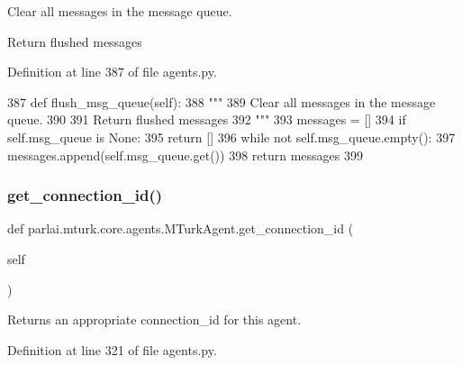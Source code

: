 \begin{DoxyVerb}Clear all messages in the message queue.

Return flushed messages
\end{DoxyVerb}
 

Definition at line 387 of file agents.\+py.


\begin{DoxyCode}
387     \textcolor{keyword}{def }flush\_msg\_queue(self):
388         \textcolor{stringliteral}{"""}
389 \textcolor{stringliteral}{        Clear all messages in the message queue.}
390 \textcolor{stringliteral}{}
391 \textcolor{stringliteral}{        Return flushed messages}
392 \textcolor{stringliteral}{        """}
393         messages = []
394         \textcolor{keywordflow}{if} self.msg\_queue \textcolor{keywordflow}{is} \textcolor{keywordtype}{None}:
395             \textcolor{keywordflow}{return} []
396         \textcolor{keywordflow}{while} \textcolor{keywordflow}{not} self.msg\_queue.empty():
397             messages.append(self.msg\_queue.get())
398         \textcolor{keywordflow}{return} messages
399 
\end{DoxyCode}
\mbox{\label{classparlai_1_1mturk_1_1core_1_1agents_1_1MTurkAgent_a67b1c261cecdb746af6ce5d545db37ab}} 
\subsubsection{\texorpdfstring{get\+\_\+connection\+\_\+id()}{get\_connection\_id()}}
{\footnotesize\ttfamily def parlai.\+mturk.\+core.\+agents.\+M\+Turk\+Agent.\+get\+\_\+connection\+\_\+id (\begin{DoxyParamCaption}\item[{}]{self }\end{DoxyParamCaption})}

\begin{DoxyVerb}Returns an appropriate connection_id for this agent.
\end{DoxyVerb}
 

Definition at line 321 of file agents.\+py.


